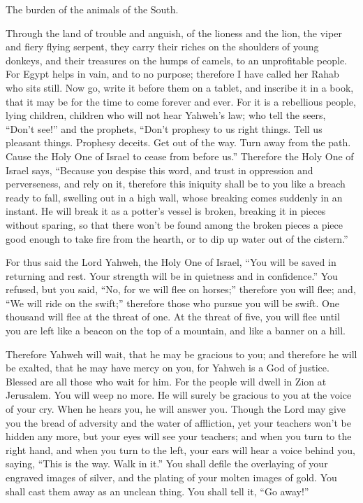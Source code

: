  The burden of the animals of the South.

Through the land of trouble and anguish, of the lioness and the lion,
the viper and fiery flying serpent, they carry their riches on the
shoulders of young donkeys, and their treasures on the humps of camels,
to an unprofitable people.  For Egypt helps in vain, and to
no purpose; therefore I have called her Rahab who sits still.
 Now go, write it before them on a tablet, and inscribe it
in a book, that it may be for the time to come forever and ever.
 For it is a rebellious people, lying children, children who
will not hear Yahweh's law;  who tell the seers, ``Don't
see!'' and the prophets, ``Don't prophesy to us right things. Tell us
pleasant things. Prophesy deceits.  Get out of the way.
Turn away from the path. Cause the Holy One of Israel to cease from
before us.''  Therefore the Holy One of Israel says,
``Because you despise this word, and trust in oppression and
perverseness, and rely on it,  therefore this iniquity
shall be to you like a breach ready to fall, swelling out in a high
wall, whose breaking comes suddenly in an instant.  He will
break it as a potter's vessel is broken, breaking it in pieces without
sparing, so that there won't be found among the broken pieces a piece
good enough to take fire from the hearth, or to dip up water out of the
cistern.''

 For thus said the Lord Yahweh, the Holy One of Israel,
``You will be saved in returning and rest. Your strength will be in
quietness and in confidence.'' You refused,  but you said,
``No, for we will flee on horses;'' therefore you will flee; and, ``We
will ride on the swift;'' therefore those who pursue you will be swift.
 One thousand will flee at the threat of one. At the threat
of five, you will flee until you are left like a beacon on the top of a
mountain, and like a banner on a hill.

 Therefore Yahweh will wait, that he may be gracious to
you; and therefore he will be exalted, that he may have mercy on you,
for Yahweh is a God of justice. Blessed are all those who wait for him.
 For the people will dwell in Zion at Jerusalem. You will
weep no more. He will surely be gracious to you at the voice of your
cry. When he hears you, he will answer you.  Though the
Lord may give you the bread of adversity and the water of affliction,
yet your teachers won't be hidden any more, but your eyes will see your
teachers;  and when you turn to the right hand, and when
you turn to the left, your ears will hear a voice behind you, saying,
``This is the way. Walk in it.''  You shall defile the
overlaying of your engraved images of silver, and the plating of your
molten images of gold. You shall cast them away as an unclean thing. You
shall tell it, ``Go away!''

